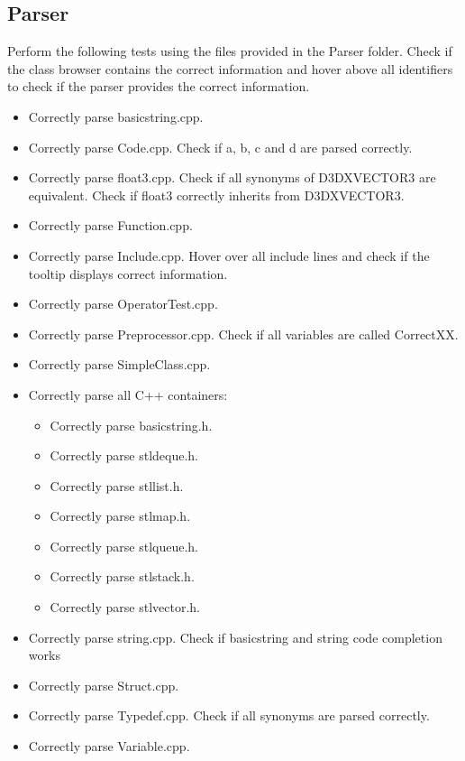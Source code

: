 \subsection{Parser}
Perform the following tests using the files provided in the Parser folder. Check if the class browser contains the correct information and hover above all identifiers to check if the parser provides the correct information.
\begin{itemize}
    \item Correctly parse basic\textunderscore string.cpp.
    \item Correctly parse Code.cpp. Check if a, b, c and d are parsed correctly.
    \item Correctly parse float3.cpp. Check if all synonyms of D3DXVECTOR3 are equivalent. Check if float3 correctly inherits from D3DXVECTOR3.
    \item Correctly parse Function.cpp.
    \item Correctly parse Include.cpp. Hover over all include lines and check if the tooltip displays correct information.
    \item Correctly parse OperatorTest.cpp. 
    \item Correctly parse Preprocessor.cpp. Check if all variables are called CorrectXX.
    \item Correctly parse SimpleClass.cpp.
    \clearpage
    \item Correctly parse all C++ containers:
    \begin{itemize}
        \item Correctly parse basic\textunderscore string.h.
        \item Correctly parse stl\textunderscore deque.h.
        \item Correctly parse stl\textunderscore list.h.
        \item Correctly parse stl\textunderscore map.h.
        \item Correctly parse stl\textunderscore queue.h.
        \item Correctly parse stl\textunderscore stack.h.
        \item Correctly parse stl\textunderscore vector.h.
    \end{itemize}
    \item Correctly parse string.cpp. Check if basic\textunderscore string and string code completion works
    \item Correctly parse Struct.cpp.
    \item Correctly parse Typedef.cpp. Check if all synonyms are parsed correctly.
    \item Correctly parse Variable.cpp.
\end{itemize}


